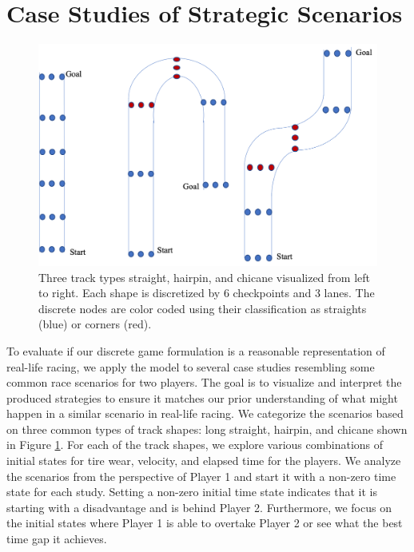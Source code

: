 \section{Case Studies of Strategic Scenarios}
\begin{figure}
\begin{center}
\includegraphics[width=\textwidth]{Figures/TrackShapes.png}
    \caption[Discrete representation of common track shapes.]{\label{fig:track_shapes} Three track types straight, hairpin, and chicane visualized from left to right. Each shape is discretized by 6 checkpoints and 3 lanes. The discrete nodes are color coded using their classification as straights (blue) or corners (red).}
\end{center}
\end{figure}
To evaluate if our discrete game formulation is a reasonable representation of real-life racing, we apply the model to several case studies resembling some common race scenarios for two players. The goal is to visualize and interpret the produced strategies to ensure it matches our prior understanding of what might happen in a similar scenario in real-life racing. We categorize the scenarios based on three common types of track shapes: long straight, hairpin, and chicane shown in Figure \ref{fig:track_shapes}. For each of the track shapes, we explore various combinations of initial states for tire wear, velocity, and elapsed time for the players. We analyze the scenarios from the perspective of Player 1 and start it with a non-zero time state for each study. Setting a non-zero initial time state indicates that it is starting with a disadvantage and is behind Player 2. Furthermore, we focus on the initial states where Player 1 is able to overtake Player 2 or see what the best time gap it achieves. 

